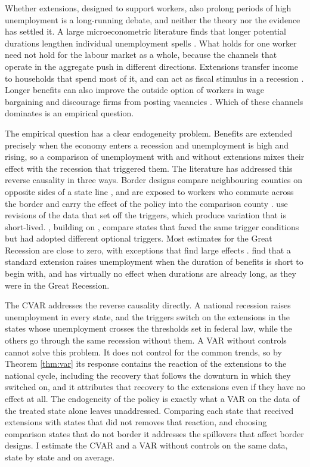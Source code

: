 \documentclass[12pt,a4paper]{article}
\theoremstyle{definition}
\begin{document}
Whether extensions, designed to support workers, also prolong periods of high unemployment is a long-running debate, and neither the theory nor the evidence has settled it. A large microeconometric literature finds that longer potential durations lengthen individual unemployment spells \citep{SchmiederVonWachter2016}. What holds for one worker need not hold for the labour market as a whole, because the channels that operate in the aggregate push in different directions. Extensions transfer income to households that spend most of it, and can act as fiscal stimulus in a recession \citep{McKayReis2016,Kekre2023}. Longer benefits can also improve the outside option of workers in wage bargaining and discourage firms from posting vacancies \citep{HagedornEtAl2019}. Which of these channels dominates is an empirical question.

The empirical question has a clear endogeneity problem. Benefits are extended precisely when the economy enters a recession and unemployment is high and rising, so a comparison of unemployment with and without extensions mixes their effect with the recession that triggered them. The literature has addressed this reverse causality in three ways. Border designs compare neighbouring counties on opposite sides of a state line \citep{BooneEtAl2021,DieterleEtAl2020}, and are exposed to workers who commute across the border and carry the effect of the policy into the comparison county \citep{DieterleEtAl2020}. \citet{ChodorowReichEtAl2019} use revisions of the data that set off the triggers, which produce variation that is short-lived. \citet{AcostaEtAl2025}, building on \citet{Rothstein2011}, compare states that faced the same trigger conditions but had adopted different optional triggers. Most estimates for the Great Recession are close to zero, with exceptions that find large effects \citep{HagedornEtAl2019,JohnstonMas2018}. \citet{AcostaEtAl2025} find that a standard extension raises unemployment when the duration of benefits is short to begin with, and has virtually no effect when durations are already long, as they were in the Great Recession.

The CVAR addresses the reverse causality directly. A national recession raises unemployment in every state, and the triggers switch on the extensions in the states whose unemployment crosses the thresholds set in federal law, while the others go through the same recession without them. A VAR without controls cannot solve this problem. It does not control for the common trends, so by Theorem \ref{thm:var} its response contains the reaction of the extensions to the national cycle, including the recovery that follows the downturn in which they switched on, and it attributes that recovery to the extensions even if they have no effect at all. The endogeneity of the policy is exactly what a VAR on the data of the treated state alone leaves unaddressed. Comparing each state that received extensions with states that did not removes that reaction, and choosing comparison states that do not border it addresses the spillovers that affect border designs. I estimate the CVAR and a VAR without controls on the same data, state by state and on average.
\end{document}
